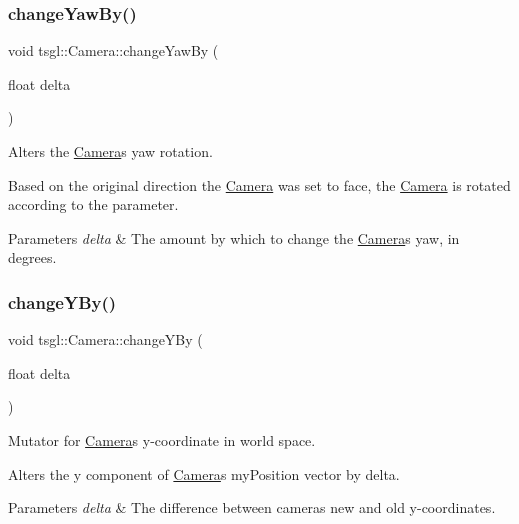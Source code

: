 \subsubsection{\texorpdfstring{change\+Yaw\+By()}{changeYawBy()}}
{\footnotesize\ttfamily void tsgl\+::\+Camera\+::change\+Yaw\+By (\begin{DoxyParamCaption}\item[{float}]{delta }\end{DoxyParamCaption})}



Alters the \hyperlink{classtsgl_1_1_camera}{Camera}\textquotesingle{}s yaw rotation. 

Based on the original direction the \hyperlink{classtsgl_1_1_camera}{Camera} was set to face, the \hyperlink{classtsgl_1_1_camera}{Camera} is rotated according to the parameter. 
\begin{DoxyParams}{Parameters}
{\em delta} & The amount by which to change the \hyperlink{classtsgl_1_1_camera}{Camera}\textquotesingle{}s yaw, in degrees. \\
\hline
\end{DoxyParams}
\mbox{\label{classtsgl_1_1_camera_a9d6f2bd303dfd57068cbb35b4be0e78c}} 
\subsubsection{\texorpdfstring{change\+Y\+By()}{changeYBy()}}
{\footnotesize\ttfamily void tsgl\+::\+Camera\+::change\+Y\+By (\begin{DoxyParamCaption}\item[{float}]{delta }\end{DoxyParamCaption})}



Mutator for \hyperlink{classtsgl_1_1_camera}{Camera}\textquotesingle{}s y-\/coordinate in world space. 

Alters the y component of \hyperlink{classtsgl_1_1_camera}{Camera}\textquotesingle{}s my\+Position vector by delta. 
\begin{DoxyParams}{Parameters}
{\em delta} & The difference between camera\textquotesingle{}s new and old y-\/coordinates. \\
\hline
\end{DoxyParams}
\mbox{\label{classtsgl_1_1_camera_ab9aa61c8939c23f31801028adc0b5b4d}} 
